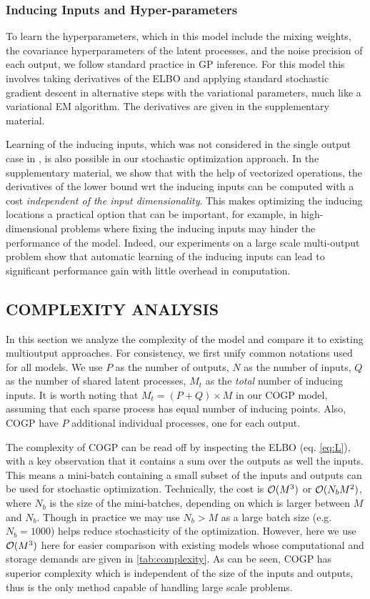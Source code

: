 \subsubsection{Inducing Inputs and Hyper-parameters \label{sec:hyperparameters}}
To learn the hyperparameters, which in this model include the mixing weights, the covariance hyperparameters of the latent processes, and the noise precision of each output, we follow standard practice in GP inference.
For this model this involves taking derivatives of the ELBO and applying standard stochastic gradient descent in alternative steps with the variational parameters, much like a variational EM algorithm. 
The derivatives are given in the supplementary material.

Learning of the inducing inputs, which was not considered in the single output case in \citet{hensmangaussian}, is also possible in our stochastic optimization approach.
In the supplementary material, we show that with the help of vectorized operations, the derivatives of the lower bound wrt the inducing inputs can be computed with a cost \emph{independent of the input dimensionality}.
This makes optimizing the inducing locations a practical option that can be important, for example, in high-dimensional problems where fixing the inducing inputs may hinder the performance of the model.
Indeed, our experiments on a large scale multi-output problem show that automatic learning of the inducing inputs can lead to significant performance gain with little overhead in computation. 
%
\subsection{COMPLEXITY ANALYSIS}
In this section we analyze the complexity of the model and compare it to existing multioutput approaches.
For consistency, we first unify common notations used for all models.
We use $P$ as the number of outputs, $N$ as the number of inputs, $Q$ as the number of shared latent processes, $M_t$ as the \emph{total} number of inducing inputs.
It is worth noting that $M_t = (P + Q) \times M$ in our COGP model, assuming that each sparse process has equal number of inducing points. 
Also, COGP have $P$ additional individual processes, one for each output.

The complexity of COGP can be read off by inspecting the ELBO (eq. \ref{eq:L}), with a key observation that it contains a sum over the outputs as well the inputs.
This means a mini-batch containing a small subset of the inputs and outputs can be used for stochastic optimization.
Technically, the cost is $\mathcal{O}(M^3)$ or $\mathcal{O}(N_bM^2)$, where $N_b$ is the size of the mini-batches, depending on which is larger between $M$ and $N_b$. 
Though in practice we may use $N_b > M$ as a large batch size (e.g. $N_b = 1000$) helps reduce stochasticity of the optimization.
However, here we use $\mathcal{O}(M^3)$ here for easier comparison with existing models whose computational and storage demands are given in \ref{tab:complexity}. 
As can be seen, COGP has superior complexity which is independent of the size of the inputs and outputs, thus is the only method capable of handling large scale problems.

